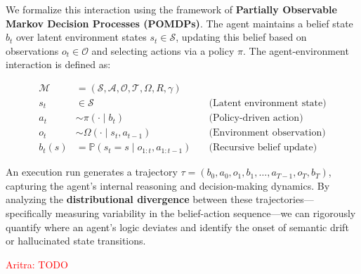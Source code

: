 \documentclass{article}
\newcommand{\ag}[1]{\textcolor{red}{Aritra: #1}}
\theoremstyle{plain}
\theoremstyle{definition}
\theoremstyle{remark}
\begin{document}
We formalize this interaction using the framework of \textbf{Partially Observable Markov Decision Processes (POMDPs)}. The agent maintains a belief state $b_t$ over latent environment states $s_t \in \mathcal{S}$, updating this belief based on observations $o_t \in \mathcal{O}$ and selecting actions via a policy $\pi$. The agent-environment interaction is defined as:

\begin{align}
    \mathcal{M} &= (\mathcal{S}, \mathcal{A}, \mathcal{O}, \mathcal{T}, \Omega, R, \gamma) \nonumber \\
    s_t &\in \mathcal{S} \quad &\text{(Latent environment state)} \nonumber \\
    a_t &\sim \pi(\cdot \mid b_t) \quad &\text{(Policy-driven action)} \nonumber \\
    o_t &\sim \Omega(\cdot \mid s_t, a_{t-1}) \quad &\text{(Environment observation)} \nonumber \\
    b_t(s) &= \mathbb{P}(s_t = s \mid o_{1:t}, a_{1:t-1}) \quad &\text{(Recursive belief update)} \nonumber
\end{align}

An execution run generates a trajectory $\tau = (b_0, a_0, o_1, b_1, \dots, a_{T-1}, o_T, b_T)$, capturing the agent's internal reasoning and decision-making dynamics. By analyzing the \textbf{distributional divergence} between these trajectories—specifically measuring variability in the belief-action sequence—we can rigorously quantify where an agent's logic deviates and identify the onset of semantic drift or hallucinated state transitions.

\ag{TODO}



\end{document}
